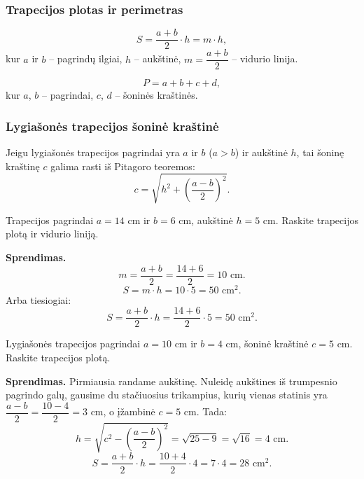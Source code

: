 \subsubsection*{Trapecijos plotas ir perimetras}

\begin{tcolorbox}[colback=blue!5!white, colframe=blue!60!black, title=Trapecijos ploto formulės]
\[
S = \frac{a+b}{2} \cdot h = m \cdot h,
\]
kur $a$ ir $b$ – pagrindų ilgiai, $h$ – aukštinė, $m = \dfrac{a+b}{2}$ – vidurio linija.
\end{tcolorbox}

\begin{tcolorbox}[colback=green!5!white, colframe=green!60!black, title=Trapecijos perimetras]
\[
P = a + b + c + d,
\]
kur $a$, $b$ – pagrindai, $c$, $d$ – šoninės kraštinės.
\end{tcolorbox}

\subsubsection*{Lygiašonės trapecijos šoninė kraštinė}

Jeigu lygiašonės trapecijos pagrindai yra $a$ ir $b$ ($a > b$) ir aukštinė $h$, tai šoninę kraštinę $c$ galima rasti iš Pitagoro teoremos:
\[
c = \sqrt{h^2 + \left(\frac{a-b}{2}\right)^2}.
\]

\begin{example}
Trapecijos pagrindai $a = 14$ cm ir $b = 6$ cm, aukštinė $h = 5$ cm. Raskite trapecijos plotą ir vidurio liniją.

\textbf{Sprendimas.}
\[
m = \frac{a+b}{2} = \frac{14+6}{2} = 10 \text{ cm}.
\]
\[
S = m \cdot h = 10 \cdot 5 = 50 \text{ cm}^2.
\]
Arba tiesiogiai:
\[
S = \frac{a+b}{2} \cdot h = \frac{14+6}{2} \cdot 5 = 50 \text{ cm}^2.
\]
\end{example}

\begin{example}
Lygiašonės trapecijos pagrindai $a = 10$ cm ir $b = 4$ cm, šoninė kraštinė $c = 5$ cm. Raskite trapecijos plotą.

\textbf{Sprendimas.} Pirmiausia randame aukštinę. Nuleidę aukštines iš trumpesnio pagrindo galų, gausime du stačiuosius trikampius, kurių vienas statinis yra $\dfrac{a-b}{2} = \dfrac{10-4}{2} = 3$ cm, o įžambinė $c = 5$ cm. Tada:
\[
h = \sqrt{c^2 - \left(\frac{a-b}{2}\right)^2} = \sqrt{25 - 9} = \sqrt{16} = 4 \text{ cm}.
\]
\[
S = \frac{a+b}{2} \cdot h = \frac{10+4}{2} \cdot 4 = 7 \cdot 4 = 28 \text{ cm}^2.
\]
\end{example}

